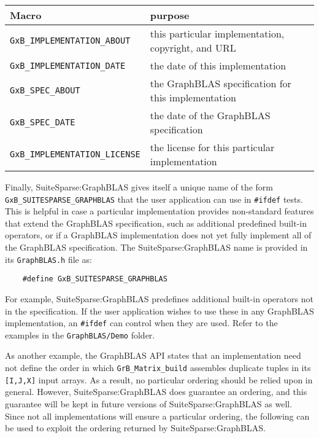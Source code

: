 \documentclass[12pt]{article}
\begin{document}
\vspace{0.2in}
{\footnotesize
\begin{tabular}{ll}
\hline
Macro                & purpose                                      \\
\hline
\verb'GxB_IMPLEMENTATION_ABOUT'
    & this particular implementation, copyright, and URL \\
\verb'GxB_IMPLEMENTATION_DATE'
    & the date of this implementation \\
\verb'GxB_SPEC_ABOUT'
    & the GraphBLAS specification for this implementation \\
\verb'GxB_SPEC_DATE'
    & the date of the GraphBLAS specification \\
\verb'GxB_IMPLEMENTATION_LICENSE'
    & the license for this particular implementation \\
\hline
\end{tabular}
}
\vspace{0.2in}

Finally, SuiteSparse:GraphBLAS gives itself a unique name of the form
\verb'GxB_SUITESPARSE_GRAPHBLAS' that the user application can use in
\verb'#ifdef' tests. This is helpful in case a particular implementation
provides non-standard features that extend the GraphBLAS specification, such as
additional predefined built-in operators, or if a GraphBLAS implementation does
not yet fully implement all of the GraphBLAS specification.  The
SuiteSparse:GraphBLAS name is provided in its \verb'GraphBLAS.h' file as:

    {\footnotesize
    \begin{verbatim}
    #define GxB_SUITESPARSE_GRAPHBLAS \end{verbatim}}

For example, SuiteSparse:GraphBLAS predefines additional built-in operators not
in the specification.  If the user application wishes to use these in any
GraphBLAS implementation, an \verb'#ifdef' can control when they are used.
Refer to the examples in the \verb'GraphBLAS/Demo' folder.

As another example, the GraphBLAS API states that an
implementation need not define the order in which \verb'GrB_Matrix_build'
assembles duplicate tuples in its \verb'[I,J,X]' input arrays.  As a result, no
particular ordering should be relied upon in general.  However,
SuiteSparse:GraphBLAS does guarantee an ordering, and this guarantee will be
kept in future versions of SuiteSparse:GraphBLAS as well.  Since not all
implementations will ensure a particular ordering, the following can be used to
exploit the ordering returned by SuiteSparse:GraphBLAS.
\end{document}
